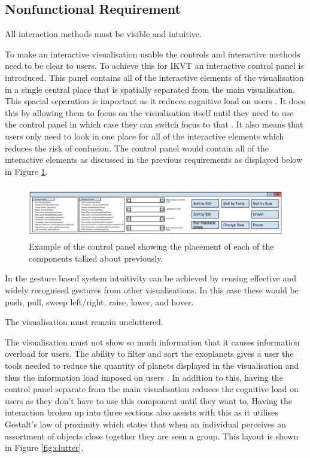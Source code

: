 \subsection{Nonfunctional Requirement}

\begin{enumerate}


{\bf \item[R6.] All interaction methods must be visible and intuitive.}

To make an interactive visualisation usable the controls and interactive
methods need to be clear to users. To achieve this for IKVT an interactive
control panel
is introduced. This panel contains all of the interactive elements
of the visualisation in a single central place that is spatially separated from
the main visualisation. This spacial separation is important as it reduces
cognitive load on users \cite{InformationCapacity}. It does this by allowing them to focus on the
visualisation itself
until they need to use the control panel in which case they can switch focus to
that \cite{mendel}. It also
means that users only need to look in one place for all of the interactive
elements which reduces the risk of confusion. The
control panel would contain all of the interactive elements as discussed in
the previous requirements as displayed below in Figure
\ref{fig:interactionPanelMock}.

\begin{figure}[H]
  \centering
      \includegraphics[width=1\textwidth]{images/allTogether.png}
  \caption[Example of the control panel]{Example of the control panel showing
the placement of each of the components talked about previously.}  
  \label{fig:interactionPanelMock}
\end{figure}

In the gesture based system intuitivity can be achieved by reusing effective and
widely recognised gestures from other visualisations. In this case these would
be push, pull, sweep left/right, raise, lower, and hover.
\clearpage
{\bf \item[R7.] The visualisation must remain uncluttered.}

The visualisation must not show so much information that it
causes information overload for users. The ability to filter and sort the
exoplanets gives a user the tools needed to
reduce the quantity of planets displayed in the visualisation and thus the
information load imposed on users \cite{lewis}. In addition to this, having the control
panel separate from the main visualisation reduces the cognitive
load on users as they don't have to use this component until they want to.
Having the interaction broken up into three sections also assists with this as it
utilises Gestalt's law of proximity \cite{withinSubject} which states that when an
individual perceives an assortment of objects close together they are seen a
group. This layout is shown in Figure \ref{fig:clutter}.


\end{enumerate}

